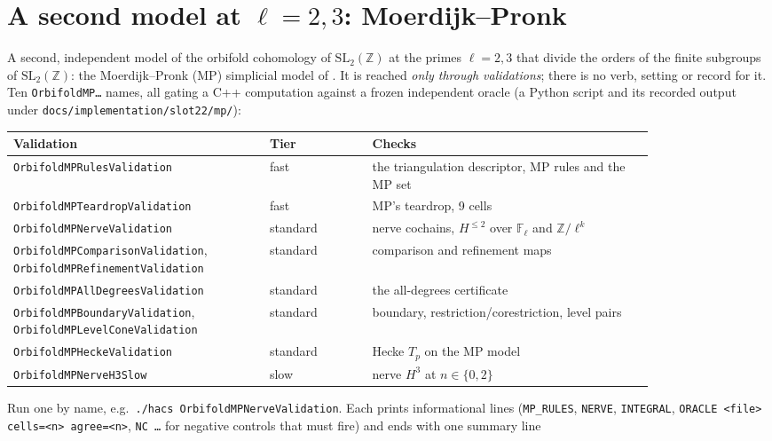 \documentclass[11pt,openany]{report}
\newcommand{\F}{\mathbb{F}}
\newcommand{\Z}{\mathbb{Z}}
\newcommand{\SL}{\mathrm{SL}}
\newcommand{\cli}[1]{\texttt{#1}}
\newcommand{\file}[1]{\nolinkurl{#1}}
\newcommand{\vb}[1]{\texttt{#1}}
\begin{document}
\section{A second model at \texorpdfstring{$\ell=2,3$}{l=2,3}: Moerdijk--Pronk}\label{sec:mp}

A second, independent model of the orbifold cohomology of $\SL_2(\Z)$ at the primes $\ell=2,3$ that divide the orders of the finite subgroups of $\SL_2(\Z)$: the
Moerdijk--Pronk (MP) simplicial model of {}. It is reached \emph{only through validations}; there is no verb,
setting or record for it. Ten \texttt{OrbifoldMP\dots} names, all gating a C++ computation against a frozen
independent oracle (a Python script and its recorded output under \file{docs/implementation/slot22/mp/}):
\begin{center}\small
\begin{tabular}{@{}>{\raggedright\arraybackslash}p{0.40\linewidth}l>{\raggedright\arraybackslash}p{0.44\linewidth}@{}}
\toprule
\textbf{Validation} & \textbf{Tier} & \textbf{Checks}\\\midrule
\vb{OrbifoldMPRulesValidation} & fast & the triangulation descriptor, MP rules and the MP set\\
\vb{OrbifoldMPTeardropValidation} & fast & MP's teardrop, 9 cells\\
\vb{OrbifoldMPNerveValidation} & standard & nerve cochains, $H^{\le2}$ over $\F_\ell$ and $\Z/\ell^k$\\
\vb{OrbifoldMPComparisonValidation}, \vb{OrbifoldMPRefinementValidation} & standard & comparison and refinement maps\\
\vb{OrbifoldMPAllDegreesValidation} & standard & the all-degrees certificate\\
\vb{OrbifoldMPBoundaryValidation}, \vb{OrbifoldMPLevelConeValidation} & standard & boundary, restriction/corestriction, level pairs\\
\vb{OrbifoldMPHeckeValidation} & standard & Hecke $T_p$ on the MP model\\
\vb{OrbifoldMPNerveH3Slow} & slow & nerve $H^3$ at $n\in\{0,2\}$\\
\bottomrule
\end{tabular}
\end{center}
Run one by name, e.g.\ \cli{./hacs OrbifoldMPNerveValidation}. Each prints informational lines
(\texttt{MP\_RULES}, \texttt{NERVE}, \texttt{INTEGRAL}, \texttt{ORACLE <file> cells=<n> agree=<n>}, \texttt{NC \dots}
for negative controls that must fire) and ends with one summary line
\end{document}
